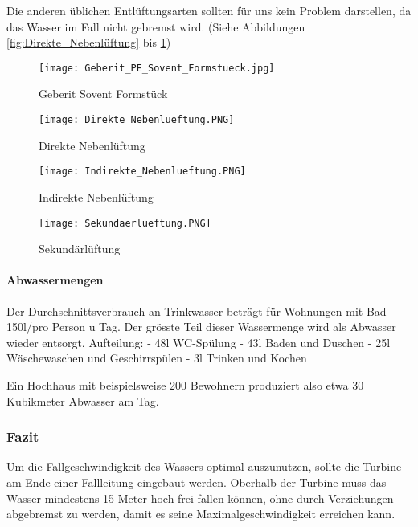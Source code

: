 Die anderen üblichen Entlüftungsarten sollten für uns kein Problem darstellen, da das Wasser im Fall nicht gebremst wird. (Siehe Abbildungen \ref{fig:Direkte_Nebenlüftung} bis \ref{fig:Sekundärlüftung})

\begin{figure}[h]
    \centering
    \begin{minipage}[t]{0.45\linewidth}
    	\centering
    	\texttt{[image: Geberit\_PE\_Sovent\_Formstueck.jpg]}
     	\caption{Geberit Sovent Formstück \cite{geberit}}
		\label{fig:Sovent}
    \end{minipage}
    \;
    \begin{minipage}[t]{0.45\linewidth}
    	\centering
    	\texttt{[image: Direkte\_Nebenlueftung.PNG]}
     	\caption{Direkte Nebenlüftung \cite{docplayer}}
        \label{fig:Direkte_Nebenlüftung}
    \end{minipage}
    \newline
    \begin{minipage}[t]{0.45\linewidth}
    	\centering
    	\texttt{[image: Indirekte\_Nebenlueftung.PNG]}
        \caption{Indirekte Nebenlüftung \cite{docplayer}}
        \label{fig:Indirekte_Nebenlüftung}    
    \end{minipage}
    \;
    \begin{minipage}[t]{0.45\linewidth}
    	\centering
    	\texttt{[image: Sekundaerlueftung.PNG]}
        \caption{Sekundärlüftung \cite{docplayer}}
        \label{fig:Sekundärlüftung}    
    \end{minipage}
\end{figure}

\paragraph{Abwassermengen}
Der Durchschnittsverbrauch an Trinkwasser beträgt für Wohnungen mit Bad 150l/pro Person u Tag. Der grösste Teil dieser Wassermenge wird als Abwasser wieder entsorgt. 
\newline
Aufteilung:
\newline
- 48l \; WC-Spülung
\newline
- 43l \; Baden und Duschen
\newline
- 25l \; Wäschewaschen und Geschirrspülen
\newline
- 3l \;  Trinken und Kochen
\newline
\cite{wohnbau}

Ein Hochhaus mit beispielsweise 200 Bewohnern produziert also etwa 30 Kubikmeter Abwasser am Tag.

\subsubsection{Fazit}
Um die Fallgeschwindigkeit des Wassers optimal auszunutzen, sollte die Turbine am Ende einer Fallleitung eingebaut werden. Oberhalb der Turbine muss das Wasser mindestens 15 Meter hoch frei fallen können, ohne durch Verziehungen abgebremst zu werden, damit es seine Maximalgeschwindigkeit erreichen kann. 


\clearpage 






